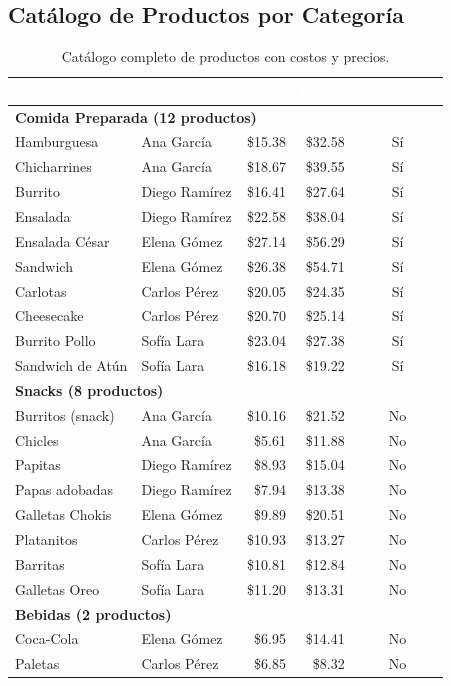\documentclass[12pt,letterpaper]{article}
\begin{document}
\subsection{Catálogo de Productos por Categoría}
\begin{table}[H]
\centering
\footnotesize
{}
\begin{tabular}{llrrc}
\toprule
\rowcolor{tabheader}
\textcolor{white}{\textbf{Producto}} &
\textcolor{white}{\textbf{Vendedor}} &
\textcolor{white}{\textbf{Costo}} &
\textcolor{white}{\textbf{Precio}} &
\textcolor{white}{\textbf{Perecedero}} \\
\midrule
\multicolumn{5}{l}{\textbf{\textcolor{primary}{Comida Preparada} (12 productos)}} \\
\midrule
Hamburguesa      & Ana García    & \$15.38 & \$32.58 & Sí \\
Chicharrines     & Ana García    & \$18.67 & \$39.55 & Sí \\
Burrito          & Diego Ramírez & \$16.41 & \$27.64 & Sí \\
Ensalada         & Diego Ramírez & \$22.58 & \$38.04 & Sí \\
Ensalada César   & Elena Gómez   & \$27.14 & \$56.29 & Sí \\
Sandwich         & Elena Gómez   & \$26.38 & \$54.71 & Sí \\
Carlotas         & Carlos Pérez  & \$20.05 & \$24.35 & Sí \\
Cheesecake       & Carlos Pérez  & \$20.70 & \$25.14 & Sí \\
Burrito Pollo    & Sofía Lara    & \$23.04 & \$27.38 & Sí \\
Sandwich de Atún & Sofía Lara    & \$16.18 & \$19.22 & Sí \\
\midrule
\multicolumn{5}{l}{\textbf{\textcolor{primary}{Snacks} (8 productos)}} \\
\midrule
Burritos (snack) & Ana García    & \$10.16 & \$21.52 & No \\
Chicles          & Ana García    & \$5.61  & \$11.88 & No \\
Papitas          & Diego Ramírez & \$8.93  & \$15.04 & No \\
Papas adobadas   & Diego Ramírez & \$7.94  & \$13.38 & No \\
Galletas Chokis  & Elena Gómez   & \$9.89  & \$20.51 & No \\
Platanitos       & Carlos Pérez  & \$10.93 & \$13.27 & No \\
Barritas         & Sofía Lara    & \$10.81 & \$12.84 & No \\
Galletas Oreo    & Sofía Lara    & \$11.20 & \$13.31 & No \\
\midrule
\multicolumn{5}{l}{\textbf{\textcolor{primary}{Bebidas} (2 productos)}} \\
\midrule
Coca-Cola        & Elena Gómez   & \$6.95  & \$14.41 & No \\
Paletas          & Carlos Pérez  & \$6.85  & \$8.32  & No \\
\bottomrule
\end{tabular}
\caption{Catálogo completo de productos con costos y precios.}
\end{table}
\end{document}
